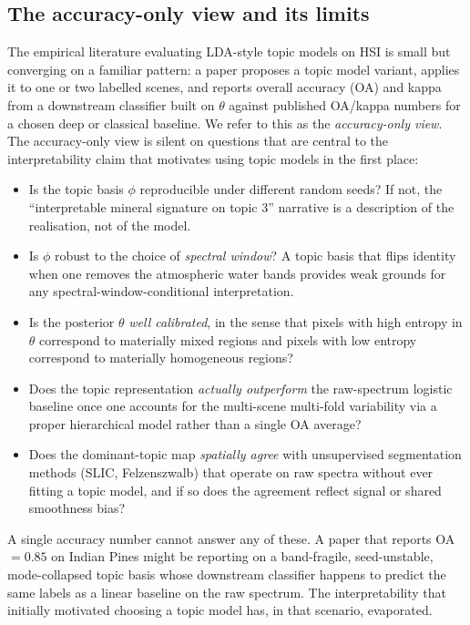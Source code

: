 \documentclass[journal,a4paper,10pt]{IEEEtran}
\begin{document}
\subsection{The accuracy-only view and its limits}

The empirical literature evaluating LDA-style topic models on HSI is
small but converging on a familiar pattern: a paper proposes a topic
model variant, applies it to one or two labelled scenes, and reports
overall accuracy (OA) and kappa from a downstream classifier built on
$\theta$ against published OA/kappa numbers for a chosen deep or
classical baseline. We refer to this as the \emph{accuracy-only view}.
The accuracy-only view is silent on questions that are central to the
interpretability claim that motivates using topic models in the first
place:

\begin{itemize}
\item Is the topic basis $\phi$ reproducible under different random
seeds? If not, the ``interpretable mineral signature on topic 3''
narrative is a description of the realisation, not of the model.
\item Is $\phi$ robust to the choice of \emph{spectral window}?
A topic basis that flips identity when one removes the atmospheric
water bands provides weak grounds for any spectral-window-conditional
interpretation.
\item Is the posterior $\theta$ \emph{well calibrated}, in the sense
that pixels with high entropy in $\theta$ correspond to materially
mixed regions and pixels with low entropy correspond to materially
homogeneous regions?
\item Does the topic representation \emph{actually outperform} the
raw-spectrum logistic baseline once one accounts for the multi-scene
multi-fold variability via a proper hierarchical model rather than a
single OA average?
\item Does the dominant-topic map \emph{spatially agree} with
unsupervised segmentation methods (SLIC, Felzenszwalb) that operate
on raw spectra without ever fitting a topic model, and if so does the
agreement reflect signal or shared smoothness bias?
\end{itemize}

A single accuracy number cannot answer any of these. A paper that
reports OA $= 0.85$ on Indian Pines might be reporting on a
band-fragile, seed-unstable, mode-collapsed topic basis whose downstream
classifier happens to predict the same labels as a linear baseline on
the raw spectrum. The interpretability that initially motivated
choosing a topic model has, in that scenario, evaporated.
\end{document}
